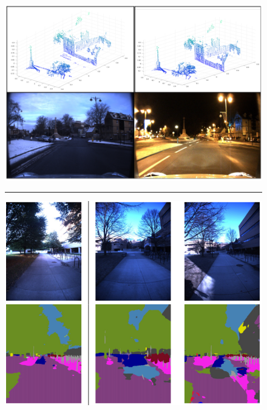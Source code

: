 \begin{figure}[t]
	\centering
	\begin{minipage}{0.48\linewidth}
		\centering
   		\includegraphics[width=\linewidth]{data_hetero/pointnetvlad.png}
	   		
   		\noindent\rule{\linewidth}{0.4pt}
   		   		
	\end{minipage}
	\begin{minipage}{0.48\linewidth}
		\centering
   		\includegraphics[width=0.95\linewidth]{data_hetero/semantic_vbl.png}
   		

\end{minipage}
\end{figure}

